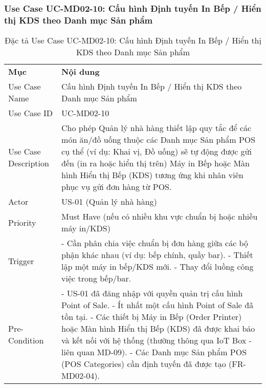 \subsubsection{Use Case UC-MD02-10: Cấu hình Định tuyến In Bếp / Hiển thị KDS theo Danh mục Sản phẩm}
\begin{longtable}{|m{4cm}|p{11cm}|}
\caption{Đặc tả Use Case UC-MD02-10: Cấu hình Định tuyến In Bếp / Hiển thị KDS theo Danh mục Sản phẩm} \label{tab:uc_md02_10} \\
\hline

\endhead %

\hline
\endfoot %

\hline
\endlastfoot %
\multicolumn{2}{|c|}{\textbf{2.1. Tóm tắt (Summary)}} \\
\hline
\textbf{Mục} & \textbf{Nội dung} \\
\hline
Use Case Name & Cấu hình Định tuyến In Bếp / Hiển thị KDS theo Danh mục Sản phẩm \\
\hline
Use Case ID & UC-MD02-10 \\
\hline
Use Case Description & Cho phép Quản lý nhà hàng thiết lập quy tắc để các món ăn/đồ uống thuộc các Danh mục Sản phẩm POS cụ thể (ví dụ: Khai vị, Đồ uống) sẽ tự động được gửi đến (in ra hoặc hiển thị trên) Máy in Bếp hoặc Màn hình Hiển thị Bếp (KDS) tương ứng khi nhân viên phục vụ gửi đơn hàng từ POS. \\
\hline
Actor & US-01 (Quản lý nhà hàng) \\
\hline
Priority & Must Have (nếu có nhiều khu vực chuẩn bị hoặc nhiều máy in/KDS) \\
\hline
Trigger & - Cần phân chia việc chuẩn bị đơn hàng giữa các bộ phận khác nhau (ví dụ: bếp chính, quầy bar). \newline - Thiết lập một máy in bếp/KDS mới. \newline - Thay đổi luồng công việc trong bếp/bar. \\
\hline
Pre-Condition & - US-01 đã đăng nhập với quyền quản trị cấu hình Point of Sale. \newline - Ít nhất một cấu hình Point of Sale đã tồn tại. \newline - Các thiết bị Máy in Bếp (Order Printer) hoặc Màn hình Hiển thị Bếp (KDS) đã được khai báo và kết nối với hệ thống (thường thông qua IoT Box - liên quan MD-09). \newline - Các Danh mục Sản phẩm POS (POS Categories) cần định tuyến đã được tạo (FR-MD02-04). \\

\end{longtable}
